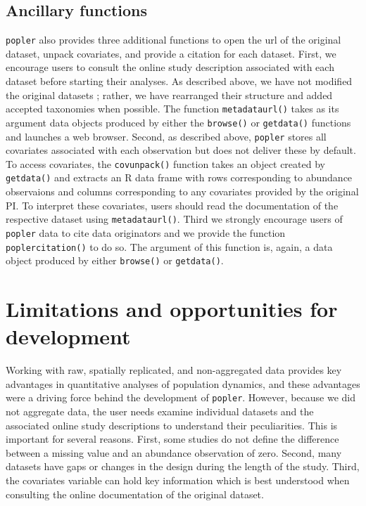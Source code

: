\documentclass{article}\usepackage[]{graphicx}\usepackage[]{color}
\newcommand{\tom}[1]{{\textit{\color{red}{[#1]}}}}
\begin{document}
\subsection*{Ancillary functions}
\texttt{popler} also provides three additional functions to open the url of the original dataset, unpack covariates, and provide a citation for each dataset. First, we encourage users to consult the online study description associated with each dataset before starting their analyses. As described above, we have not modified the original datasets ; rather, we have rearranged their structure and added accepted taxonomies when possible. The function \texttt{metadata\textunderscore url()} takes as its argument data objects produced by either the \texttt{browse()} or \texttt{get\textunderscore data()} functions and launches a web browser. Second, as described above, \texttt{popler} stores all covariates associated with each observation but does not deliver these by default. To access covariates, the \texttt{cov\textunderscore unpack()} function takes an object created by \texttt{get\textunderscore data()} and extracts an R data frame with rows corresponding to abundance observaions and columns corresponding to any covariates provided by the original PI. To interpret these covariates, users should read the documentation of the respective dataset using \texttt{metadata\textunderscore url()}. Third we strongly encourage users of \texttt{popler} data to cite data originators and we provide the function \texttt{popler\textunderscore citation()} to do so. The argument of this function is, again, a data object produced by either \texttt{browse()} or \texttt{get\textunderscore data()}.

\section*{Limitations and opportunities for development}
\tom{I did not do too much to this section. I think it needs to be stronger but we can continue to polish this. Probably OK for sending to coauthors.}
Working with raw, spatially replicated, and non-aggregated data provides key advantages in quantitative analyses of population dynamics, and these advantages were a driving force behind the development of \texttt{popler}. However, because we did not aggregate data, the user needs examine individual datasets and the associated online study descriptions to understand their peculiarities. This is important for several reasons. First, some studies do not define the difference between a missing value and an abundance observation of zero. Second, many datasets have gaps or changes in the design during the length of the study. Third, the covariates variable can hold key information which is best understood when consulting the online documentation of the original dataset. 
\end{document}
